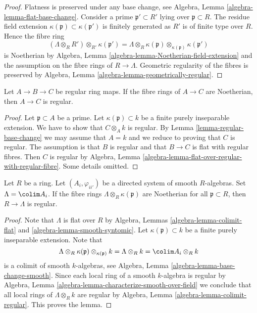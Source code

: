 \begin{proof}
Flatness is preserved under any base change, see
Algebra, Lemma \ref{algebra-lemma-flat-base-change}.
Consider a prime $\mathfrak p' \subset R'$ lying over
$\mathfrak p \subset R$. The residue field extension
$\kappa(\mathfrak p) \subset \kappa(\mathfrak p')$ is
finitely generated as $R'$ is of finite type over $R$.
Hence the fibre ring
$$
(\Lambda \otimes_R R') \otimes_{R'} \kappa(\mathfrak p') =
\Lambda \otimes_R \kappa(\mathfrak p) \otimes_{\kappa(\mathfrak p)} 
\kappa(\mathfrak p')
$$
is Noetherian by
Algebra, Lemma \ref{algebra-lemma-Noetherian-field-extension}
and the assumption on the fibre rings of $R \to \Lambda$.
Geometric regularity of the fibres is preserved by
Algebra, Lemma \ref{algebra-lemma-geometrically-regular}.
\end{proof}

\begin{lemma}
\label{lemma-regular-composition}
Let $A \to B \to C$ be regular ring maps.
If the fibre rings of $A \to C$ are Noetherian, then
$A \to C$ is regular.
\end{lemma}

\begin{proof}
Let $\mathfrak p \subset A$ be a prime. Let $\kappa(\mathfrak p) \subset k$
be a finite purely inseparable extension. We have to show that
$C \otimes_A k$ is regular. By Lemma \ref{lemma-regular-base-change}
we may assume that $A = k$ and we reduce to proving that $C$ is regular.
The assumption is that $B$ is regular and that $B \to C$ is flat
with regular fibres. Then $C$ is regular by Algebra, Lemma
\ref{algebra-lemma-flat-over-regular-with-regular-fibre}.
Some details omitted.
\end{proof}

\begin{lemma}
\label{lemma-colimit-smooth-regular}
Let $R$ be a ring. Let $(A_i, \varphi_{ii'})$ be a directed system
of smooth $R$-algebras. Set $\Lambda = \colim A_i$. If the fibre
rings $\Lambda \otimes_R \kappa(\mathfrak p)$ are Noetherian for all
$\mathfrak p \subset R$, then $R \to \Lambda$ is regular.
\end{lemma}

\begin{proof}
Note that $\Lambda$ is flat over $R$ by
Algebra, Lemmas \ref{algebra-lemma-colimit-flat} and
\ref{algebra-lemma-smooth-syntomic}.
Let $\kappa(\mathfrak p) \subset k$ be a finite purely inseparable
extension. Note that
$$
\Lambda \otimes_R \kappa(\mathfrak p) \otimes_{\kappa(\mathfrak p)} k =
\Lambda \otimes_R k = \colim A_i \otimes_R k
$$
is a colimit of smooth $k$-algebras, see
Algebra, Lemma \ref{algebra-lemma-base-change-smooth}.
Since each local ring of a smooth $k$-algebra is regular by
Algebra, Lemma \ref{algebra-lemma-characterize-smooth-over-field}
we conclude that all local rings of $\Lambda \otimes_R k$ are
regular by
Algebra, Lemma \ref{algebra-lemma-colimit-regular}.
This proves the lemma.
\end{proof}

